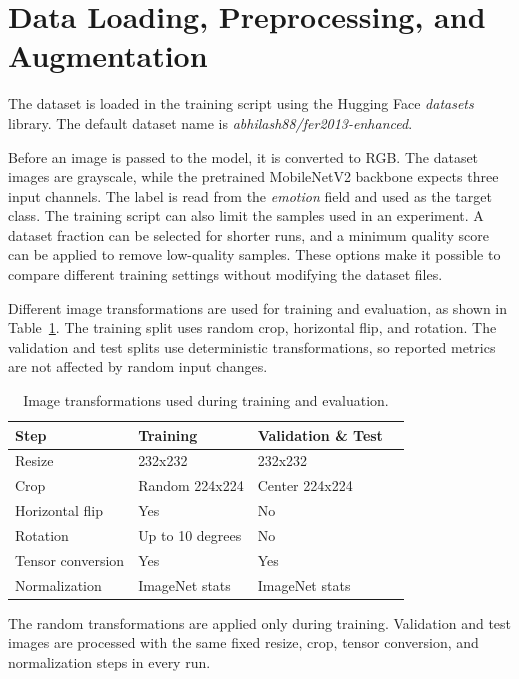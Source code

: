 \section{Data Loading, Preprocessing, and Augmentation}

The dataset is loaded in the training script using the Hugging Face \textit{datasets} library. The default dataset name is \textit{abhilash88/fer2013-enhanced}.

Before an image is passed to the model, it is converted to RGB. The dataset images are grayscale, while the pretrained MobileNetV2 backbone expects three input channels. The label is read from the \textit{emotion} field and used as the target class. The training script can also limit the samples used in an experiment. A dataset fraction can be selected for shorter runs, and a minimum quality score can be applied to remove low-quality samples. These options make it possible to compare different training settings without modifying the dataset files.

Different image transformations are used for training and evaluation, as shown in Table~\ref{tab:image-transforms}. The training split uses random crop, horizontal flip, and rotation. The validation and test splits use deterministic transformations, so reported metrics are not affected by random input changes.

\begin{table}[h]
    \centering
    \begin{tabular}{llll}
        \hline
        Step & Training & Validation \& Test \\
        \hline
        Resize & 232x232 & 232x232 \\
        Crop & Random 224x224 & Center 224x224 \\
        Horizontal flip & Yes & No \\
        Rotation & Up to 10 degrees & No \\
        Tensor conversion & Yes & Yes \\
        Normalization & ImageNet stats & ImageNet stats \\
        \hline
    \end{tabular}
    \caption{Image transformations used during training and evaluation.}
    \label{tab:image-transforms}
\end{table}

The random transformations are applied only during training. Validation and test images are processed with the same fixed resize, crop, tensor conversion, and normalization steps in every run.


